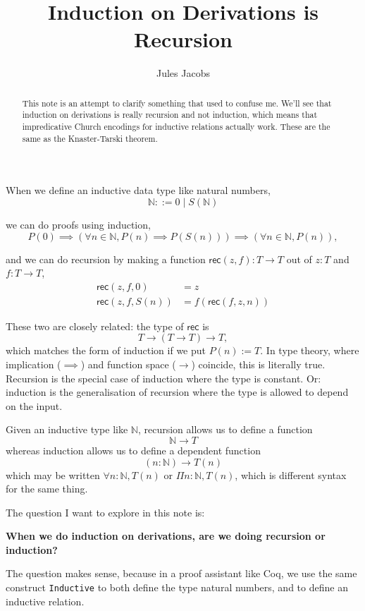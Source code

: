 \documentclass[a4paper, 11pt]{article}
\title{Induction on Derivations is Recursion}
\author{Jules Jacobs}
\newcommand{\N}{\mathbb{N}}
\newcommand{\rec}{\mathsf{rec}}
\theoremstyle{definition}
\begin{document}
\maketitle

\begin{abstract}
  This note is an attempt to clarify something that used to confuse me. We'll see that induction on derivations is really recursion and not induction, which means that impredicative Church encodings for inductive relations actually work. These are the same as the Knaster-Tarski theorem.
\end{abstract}

When we define an inductive data type like natural numbers,
\[
  \N ::= 0 \mid S(\N)
\]

we can do proofs using induction,
\[
  P(0) \implies (\forall n\in \N, P(n) \implies P(S(n))) \implies (\forall n\in \N, P(n)),
\]

and we can do recursion by making a function $\rec(z,f) : T \to T$ out of $z : T$ and $f : T \to T$,
\begin{align*}
  \rec(z,f,0) &= z \\
  \rec(z,f,S(n)) &= f(\rec(f,z,n))
\end{align*}

These two are closely related: the type of $\rec$ is
\[
  T \to (T \to T) \to T,
\]
which matches the form of induction if we put $P(n) := T$. In type theory, where implication ($\implies$) and function space ($\to$) coincide, this is literally true. Recursion is the special case of induction where the type is constant. Or: induction is the generalisation of recursion where the type is allowed to depend on the input.

Given an inductive type like $\N$, recursion allows us to define a function
\[
  \N \to T
\]
whereas induction allows us to define a dependent function
\[
  (n : \N) \to T(n)
\]
which may be written $\forall n : \N, T(n)$ or $\Pi n : \N, T(n)$, which is different syntax for the same thing.

The question I want to explore in this note is:

\begin{center}
  \textbf{When we do induction on derivations, are we doing recursion or induction?}
\end{center}

The question makes sense, because in a proof assistant like Coq, we use the same construct \lstinline|Inductive| to both define the type natural numbers, and to define an inductive relation.
\end{document}
